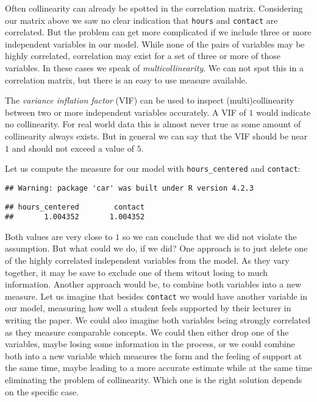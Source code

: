\documentclass[
]{book}
\begin{document}
Often collinearity can already be spotted in the correlation matrix. Considering
our matrix above we saw no clear indication that \texttt{hours} and \texttt{contact} are
correlated. But the problem can get more complicated if we include three or more
independent variables in our model. While none of the pairs of variables may be
highly correlated, correlation may exist for a set of three or more of those
variables. In these cases we speak of \emph{multicollinearity}. We can not spot this
in a correlation matrix, but there is an easy to use measure available.

The \emph{variance inflation factor} (VIF) can be used to inspect (multi)collinearity
between two or more independent variables accurately. A VIF of \(1\) would
indicate no collinearity. For real world data this is almost never true as some
amount of collinearity always exists. But in general we can say that the VIF
should be near \(1\) and should not exceed a value of \(5\).

Let us compute the measure for our model with \texttt{hours\_centered} and \texttt{contact}:

\begin{verbatim}
## Warning: package 'car' was built under R version 4.2.3
\end{verbatim}

\begin{verbatim}
## hours_centered        contact 
##       1.004352       1.004352
\end{verbatim}

Both values are very close to \(1\) so we can conclude that we did not violate
the assumption. But what could we do, if we did? One approach is to just delete
one of the highly correlated independent variables from the model. As they vary
together, it may be save to exclude one of them witout losing to much
information. Another approach would be, to combine both variables into a new
measure. Let us imagine that besides \texttt{contact} we would have another variable in
our model, measuring how well a student feels supported by their lecturer in
writing the paper. We could also imagine both variables being strongly
correlated as they measure comparable concepts. We could then either drop one of
the variables, maybe losing some information in the process, or we could combine
both into a new variable which measures the form and the feeling of support at
the same time, maybe leading to a more accurate estimate while at the same time
eliminating the problem of collinearity. Which one is the right solution
depends on the specific case.
\end{document}
